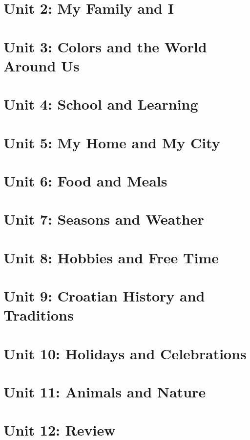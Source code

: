 \section{Unit 2: My Family and I}

\section{Unit 3: Colors and the World Around Us}

\section{Unit 4: School and Learning}

\section{Unit 5: My Home and My City}

\section{Unit 6: Food and Meals}

\section{Unit 7: Seasons and Weather}

\section{Unit 8: Hobbies and Free Time}

\section{Unit 9: Croatian History and Traditions}

\section{Unit 10: Holidays and Celebrations}

\section{Unit 11: Animals and Nature}

\section{Unit 12: Review}
